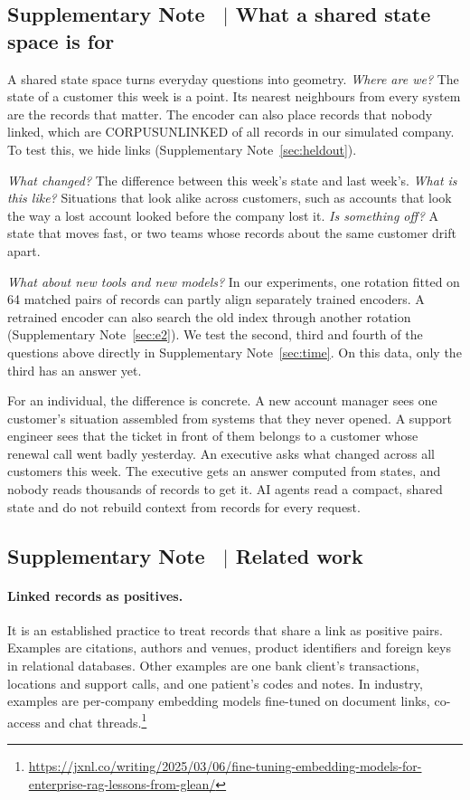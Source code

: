 \documentclass[11pt]{article}
\newcounter{suppnote}
\newcommand{\suppnote}[2]{\refstepcounter{suppnote}\label{#2}\subsection{Supplementary Note \thesuppnote\ $|$ #1}}
\begin{document}
\suppnote{What a shared state space is for}{sec:whatfor}
A shared state space turns everyday questions into geometry.
\emph{Where are we?} The state of a customer this week is a point. Its nearest neighbours from every system are the records that matter. The encoder can also place records that nobody linked, which are CORPUSUNLINKED of all records in our simulated company. To test this, we hide links (Supplementary Note~\ref{sec:heldout}).

\emph{What changed?} The difference between this week's state and last week's.
\emph{What is this like?} Situations that look alike across customers, such as accounts that look the way a lost account looked before the company lost it.
\emph{Is something off?} A state that moves fast, or two teams whose records about the same customer drift apart.

\emph{What about new tools and new models?} In our experiments, one rotation fitted on 64 matched pairs of records can partly align separately trained encoders. A retrained encoder can also search the old index through another rotation (Supplementary Note~\ref{sec:e2}).
We test the second, third and fourth of the questions above directly in Supplementary Note~\ref{sec:time}. On this data, only the third has an answer yet.

For an individual, the difference is concrete. A new account manager sees one customer's situation assembled from systems that they never opened. A support engineer sees that the ticket in front of them belongs to a customer whose renewal call went badly yesterday. An executive asks what changed across all customers this week. The executive gets an answer computed from states, and nobody reads thousands of records to get it. AI agents read a compact, shared state and do not rebuild context from records for every request.

\suppnote{Related work}{sec:related}
\paragraph{Linked records as positives.} It is an established practice to treat records that share a link as positive pairs. Examples are citations\citep{cohan2020specter}, authors and venues\citep{zhang2022metadata}, product identifiers\citep{peeters2022supervised} and foreign keys in relational databases\citep{peleska2025relational}. Other examples are one bank client's transactions, locations and support calls\citep{mollaev2025banking}, and one patient's codes and notes\citep{cai2024ehr}. In industry, examples are per-company embedding models fine-tuned on document links, co-access and chat threads.\footnote{\url{https://jxnl.co/writing/2025/03/06/fine-tuning-embedding-models-for-enterprise-rag-lessons-from-glean/}}
\end{document}
